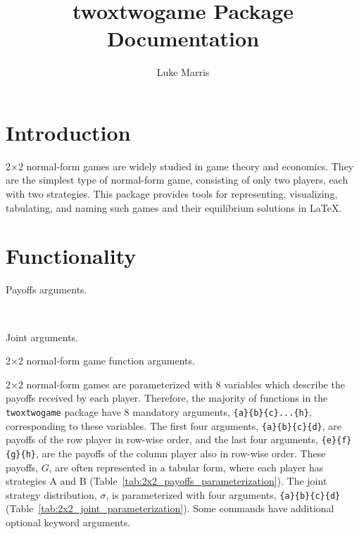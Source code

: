 \documentclass[10pt]{article}
\title{twoxtwogame Package Documentation}
\author{Luke Marris}
\begin{document}
\maketitle

\section{Introduction}

2×2 normal-form games are widely studied in game theory and economics. They are the simplest type of normal-form game, consisting of only two players, each with two strategies. This package provides tools for representing, visualizing, tabulating, and naming such games and their equilibrium solutions in \LaTeX.


\section{Functionality}

\begin{table}[!b]
    \centering
    \begin{subtable}[t]{0.4\linewidth}
        \centering
        \caption{Payoffs arguments.}
        \label{tab:2x2_payoffs_parameterization}
    \end{subtable}
    ~~~~
    \begin{subtable}[t]{0.4\linewidth}
        \centering
        \caption{Joint arguments.}
        \label{tab:2x2_joint_parameterization}
    \end{subtable}
    \caption{2×2 normal-form game function arguments.}
    \label{tab:2x2_parameterization}
\end{table}

2×2 normal-form games are parameterized with 8 variables which describe the payoffs received by each player. Therefore, the majority of functions in the \verb!twoxtwogame! package have 8 mandatory arguments, \verb!{a}{b}{c}...{h}!, corresponding to these variables. The first four arguments, \verb!{a}{b}{c}{d}!, are payoffs of the row player in row-wise order, and the last four arguments, \verb!{e}{f}{g}{h}!, are the payoffs of the column player also in row-wise order. These payoffs, $G$, are often represented in a tabular form, where each player has strategies A and B (Table~\ref{tab:2x2_payoffs_parameterization}). The joint strategy distribution, $\sigma$, is parameterized with four arguments, \verb!{a}{b}{c}{d}! (Table~\ref{tab:2x2_joint_parameterization}). Some commands have additional optional keyword arguments.
\end{document}
